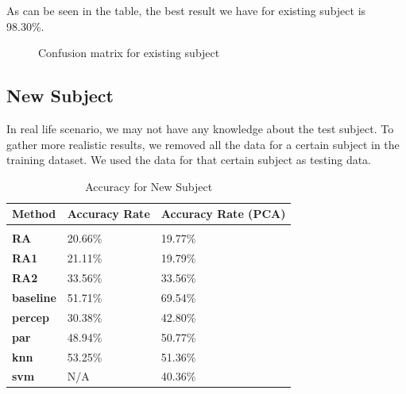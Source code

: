 \documentclass{article} %
\begin{document}
As can be seen in the table, the best result we have for existing subject is 98.30\%.

\begin{figure}[hbt]
\begin{center}
\end{center}
\caption{Confusion matrix for existing subject}
\end{figure}


\subsection{New Subject}

In real life scenario, we may not have any knowledge about the test subject. To gather more realistic results, we removed all the data for a certain subject in the training dataset. We used the data for that certain subject as testing data.  

\begin{table}[H]
\caption{Accuracy for New Subject}
\begin{center}
\begin{tabular}{lll}
{\bf Method} & {\bf Accuracy Rate} & {\bf Accuracy Rate (PCA)} \\
\hline \\
{\bf RA}       & 20.66\% & 19.77\% \\
{\bf RA1}      & 21.11\% & 19.79\% \\
{\bf RA2}      & 33.56\% & 33.56\% \\
{\bf baseline} & 51.71\% & 69.54\% \\
{\bf percep}   & 30.38\% & 42.80\% \\
{\bf par}      & 48.94\% & 50.77\% \\
{\bf knn}      & 53.25\% & 51.36\% \\
{\bf svm}      & N/A     & 40.36\% \\
\end{tabular}
\end{center}
\end{table}
\end{document}
